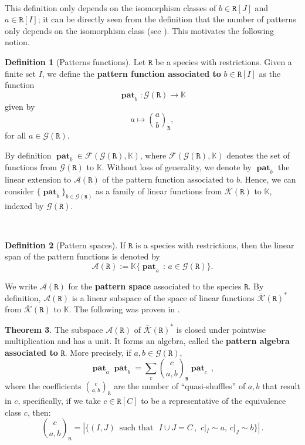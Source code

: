 \documentclass[12pt, reqno]{amsart}
\theoremstyle{definition}
\newtheorem{thm}{Theorem}[section]
\newtheorem{defin}[thm]{Definition}
\DeclareMathOperator{\pat}{\mathbf{pat}}
\newcommand{\prR}{\mathtt{R}}
\newcommand{\Kc}{\mathcal{K}}
\newcommand{\Kcb}{\overline{\Kc}}
\begin{document}
\

This definition only depends on the isomorphism classes of $b \in \prR[J]$ and $a \in \prR[I]$; it can be directly seen from the definition that the number of patterns only depends on the isomorphism class (see \cite{Penaguiao2020}). This motivates the following notion.

\begin{defin}[Patterns functions]\label{defin:pattern}
Let $\prR$ be a species with restrictions. Given a finite set $I$, we define the {\bf pattern function associated to} $b \in \prR[I]$ as the function
\[\pat_b: \mathcal{G}(\prR) \to \mathbb{K} \]
given by
\begin{equation}
    a \mapsto \binom{a}{b}_{\!\prR},
\end{equation}
for all $a \in \mathcal{G}(\prR)$.
\end{defin}

By definition $\pat_b \in \mathcal{F}(\mathcal{G}(\prR), \mathbb{K})$, where $\mathcal{F}(\mathcal{G}(\prR), \mathbb{K})$ denotes the set of functions from $\mathcal{G}(\prR)$ to $\mathbb{K}$. Without loss of generality, we denote by $\pat_b$ the linear extension to $\mathcal{A}(\mathtt{\prR})$ of the pattern function associated to $b$. Hence, we can consider $\{ \pat_b \}_{b\in \mathcal{G}(\prR)}$ as a family of linear functions from $\Kcb(\prR)$ to $\mathbb{K}$, indexed by $\mathcal{G}(\prR)$.

\

\begin{defin}[Pattern spaces]
If $\prR$ is a species with restrictions, then the linear span of the pattern functions is denoted by
\begin{equation}
    \mathcal{A}(\prR):=\mathbb{K}\{\pat_a \, : \, a\in \mathcal{G}(\prR)\}.
\end{equation}
\end{defin}

We write $\mathcal{A}(\prR)$ for the {\bf pattern space} associated to the species $\prR$. By definition, $\mathcal{A}(\prR)$ is a linear subspace of the space of linear functions $\Kcb(\prR)^*$ from $\Kcb(\prR)$ to $\mathbb{K}$. The following was proven in \cite{Penaguiao2020}.

\begin{thm}
The subspace $\mathcal{A}(\prR)$ of $\Kcb(\prR)^*$ is closed under pointwise multiplication and has a unit.
It forms an algebra, called the {\bf pattern algebra associated to} $\prR$.
More precisely, if $a, b \in \mathcal G(\prR)$,
\begin{equation}\label{eq:prodrule}
\pat_ a   \pat_b = \sum_c \binom{c}{a, b}_{\! \prR} \pat_c \, ,
\end{equation}
where the coefficients $\binom{c}{a, b}_{\!\prR}$ are the number of ``quasi-shuffles'' of $a, b$ that result in $c$, specifically, if we take $c\in \prR[C]$ to be a representative of the equivalence class $c$, then:
$$ \binom{c}{a, b}_{\!\prR} = \left| \{(I, J) \, \text{ such that } \, \,  I \cup J = C \, ,\, \, c|_{I} \sim a, \, c|_{J} \sim b \} \right| \, .  $$
\end{thm} 
\end{document}
